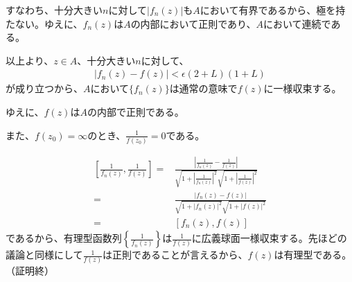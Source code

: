 すなわち、十分大きい$n$に対して$|f_n(z)|$も$A$において有界であるから、極を持たない。ゆえに、$f_n(z)$は$A$の内部において正則であり、$A$において連続である。

以上より、$z\in A$、十分大きい$n$に対して、
\begin{align*}
    |f_n(z)-f(z)|
    <\epsilon(2+L)(1+L)
\end{align*}
が成り立つから、$A$において$\{f_n(z)\}$は通常の意味で$f(z)$に一様収束する。

ゆえに、$f(z)$は$A$の内部で正則である。

また、$f(z_0)=\infty$のとき、$\frac{1}{f(z_0)}=0$である。

\begin{align*}
    \left[\frac{1}{f_n(z)},\frac{1}{f(z)}\right]
    =&\frac{\left|\frac{1}{f_n(z)}-\frac{1}{f(z)}\right|}{\sqrt{1+\left|\frac{1}{f_n(z)}\right|^2}\sqrt{1+\left|\frac{1}{f(z)}\right|^2}}\\
    =&\frac{\left|f_n(z)-f(z)\right|}{\sqrt{1+\left|f_n(z)\right|^2}\sqrt{1+\left|f(z)\right|^2}}\\
    =&[f_n(z),f(z)]
\end{align*}
であるから、有理型函数列$\left\{\frac{1}{f_n(z)}\right\}$は$\frac{1}{f(z)}$に広義球面一様収束する。先ほどの議論と同様にして$\frac{1}{f(z)}$は正則であることが言えるから、$f(z)$は有理型である。（証明終）



%
%

%
%
%
%
%
%
%
%

